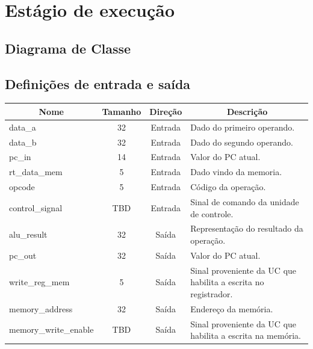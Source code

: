 \section{Estágio de execução}
	\subsection{Diagrama de Classe}
  \begin{figure}[h]
    
  \end{figure}
		
		\subsection{Definições de entrada e saída}
		
	\begin{center}
		\begin{longtable}[pos]{| l | c | c | m{7cm} |} \hline
			\multicolumn{1}{|c|}{\cellcolor[gray]{0.9}\textbf{Nome}} & 
			\multicolumn{1}{c|}{\cellcolor[gray]{0.9}\textbf{Tamanho}} & 
			\multicolumn{1}{c|}{\cellcolor[gray]{0.9}\textbf{Direção}} &
			\multicolumn{1}{c|}{\cellcolor[gray]{0.9}\textbf{Descrição}} \\ \hline
			\endhead
			\hline
			\endlastfoot
			

			data\_a & 32 & Entrada & Dado do primeiro operando. \\ \hline
			data\_b & 32 & Entrada & Dado do segundo operando. \\ \hline
			pc\_in & 14 & Entrada & Valor do PC atual. \\ \hline
			rt\_data\_mem & 5 & Entrada & Dado vindo da memoria. \\ \hline
			opcode & 5 & Entrada & Código da operação.\\ \hline
			control\_signal & TBD & Entrada & Sinal de comando da unidade de controle. \\ \hline
			alu\_result & 32 & Saída & Representação do resultado da operação. \\ \hline
			pc\_out & 32 & Saída & Valor do PC atual. \\ \hline
			write\_reg\_mem & 5 & Saída & Sinal proveniente da UC que habilita a escrita no registrador. \\ \hline
			memory\_address & 32 & Saída & Endereço da memória. \\ \hline
			memory\_write\_enable & TBD & Saída & Sinal proveniente da UC que habilita a escrita na memória.
			
		\end{longtable}
	\end{center}
	

